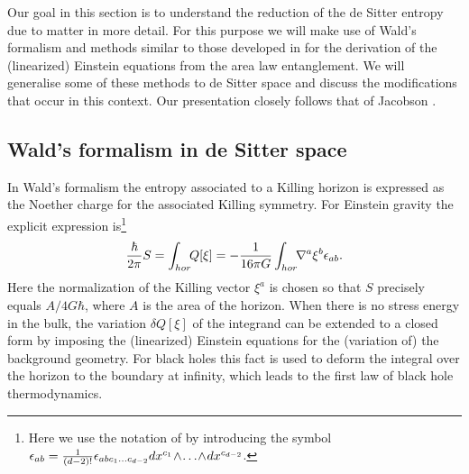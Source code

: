 \documentclass[a4paper,12pt]{article}
\newcommand{\be}{\begin{equation}}
\newcommand{\ee}{\end{equation}}
\begin{document}


Our goal in this section is to understand the reduction of the de Sitter entropy due to matter in more detail. For this purpose we will make use of Wald's formalism \cite{WaldNoether} and methods similar to those developed in \cite{Raamsdonketal, Swingle-vR, Jacobson2} for the derivation of the (linearized) Einstein equations from the area law entanglement.  We will generalise some of these methods to de Sitter space and discuss the modifications that occur in this context. Our presentation closely follows that of Jacobson \cite{Jacobson2}.  

\subsection{Wald's formalism in de Sitter space}

In Wald's formalism \cite{WaldNoether} the entropy associated to a Killing horizon is expressed as the Noether charge for the associated Killing symmetry.  For Einstein gravity the explicit expression is\footnote{Here we use the notation of \cite{Raamsdonketal} by introducing the symbol ${\bf\epsilon}_{ab}= {1\over (d-2)!}\epsilon_{abc_1\ldots c_{d-2}} dx^{c_1}\!\wedge\!\ldots \!\wedge\! dx^{c_{d-2}}$.} 
\be
\label{Noether}
{\hbar\over 2\pi} S = \int_{hor}\!\! Q[\xi] = -{1\over 16\pi G} \int_{hor}\!\!\nabla^a \xi^b {\mathbf \epsilon}_{ab} .
\ee
Here the normalization of the Killing vector $\xi^a$ is chosen so that $S$   precisely  equals $A/4 G\hbar$, where $A$ is the area of 
the horizon.  When there is no stress energy in the bulk, the variation $\delta Q[\xi]$ of the integrand can be extended to a closed form by imposing the (linearized) Einstein equations for the (variation of) the background geometry.  For black holes this fact is used to deform the integral over the horizon to the boundary at infinity, which leads to the first law of black hole thermodynamics. 
\end{document}
